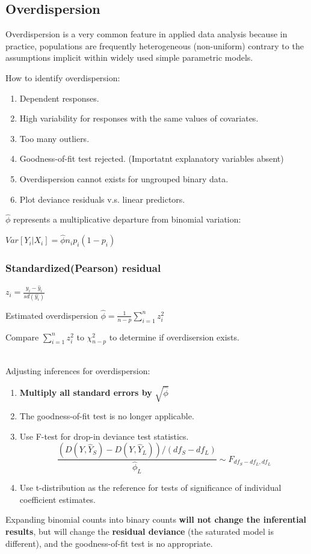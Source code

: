 \documentclass[10pt,landscape, fleqn]{article}
\begin{document}
\begin{multicols}{3}
			\subsection{Overdispersion}
				Overdispersion is a very common feature in applied data analysis because in practice, populations are frequently heterogeneous (non-uniform) contrary to the assumptions implicit within widely used simple parametric models. \par 
				How to identify overdispersion:
				\begin{enumerate}
					\item Dependent responses. 
					\item High variability for responses with the same values of covariates.
					\item Too many outliers.
					\item Goodness-of-fit test rejected. (Importatnt explanatory variables absent)
					\item Overdispersion cannot exists for ungrouped binary data.
					\item Plot deviance residuals v.s. linear predictors.
				\end{enumerate}
				$\hat{\phi}$ represents a multiplicative departure from binomial variation:\par 
				$Var[Y_i|X_i] = \hat{\phi}n_ip_i(1-p_i)$\par 
				\subsubsection{Standardized(Pearson) residual}
				$z_i = \frac{y_i-\hat{y}_i}{sd(\hat{y_i})}$ \par 
				Estimated overdispersion $\hat{\phi} = \frac{1}{n-p}\sum_{i=1}^{n}z_i^2$ \par 
				Compare $\sum_{i=1}^{n}z_i^2$ to $\chi_{n-p}^2$ to determine if overdisersion exists. \par 
				\ \\
				Adjusting inferences for overdispersion:
				\begin{enumerate}
					\item \textbf{Multiply all standard errors by} $\sqrt{\hat{\phi}}$
					\item The goodness-of-fit test is no longer applicable.
					\item Use F-test for drop-in deviance test statistics.
					\[ \frac{(D(Y,\hat{Y}_S) - D(Y, \hat{Y}_L))/(df_S-df_L)}{\hat{\phi}_L} \sim F_{df_S-df_L, df_L} \]
					\item Use t-distribution as the reference for tests of significance of individual coefficient estimates.
				\end{enumerate}
				Expanding binomial counts into binary counts \textbf{will not change the inferential results}, but will change the \textbf{residual deviance} (the saturated model is different), and the goodness-of-fit test is no appropriate.
				

\end{multicols}
\end{document}
